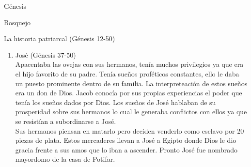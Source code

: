 \begin{section}{Génesis}
\begin{subsection}{Bosquejo}
\begin{subsubsection}{La historia patriarcal (Génesis 12-50)}
\begin{enumerate}
El regreso de Jacob a Canaán se narra que no fue sencillo, la riña entre Esaú y Jacob ponía en peligro la supervivencia de su propia familia. De manera inesperada se narra que Jacob lucha con Dios quien al final de la lucha le cambia el nombre de ``Jacob'' por el de ``Israel'', mostrando que aunque Jacob siempre había sido un engañador finalmente lo reconoce como Israle que significa ``el que lucha'', ese sería el nombre del resto de su descendencia.\\
En el antiguo Testamento cuando se habla del Ángel de Jehova se refiera a Dios Hijo. El propósito de este evento fue el de animar a Jacob por la preocupación que tenía del póximo encuentro con su hermano.\\
Jacob se encuentra finalmente con Esaú en el capítulo 33, el reencuentro de parte de Jacob es muy cauteloso y respetuoso pero Esaú al ver a Jacob va y lo besa en muestra de afecto y ambos lloran después de 20 años de separación. Jacob muestra el cambio de su ser, Esaú al igual no era el mismo, había cambiado su odio en afecto.\\
Jacob reinicia su viaje rumbo a Siquem y se pregunta sobre cómo habría de defenderse ante el peligro que se le presentaba con su familia. Dios le dice a Jacob que vaya a Betel y se le  volvió a aparecer, lo bendijo y le dio el mandamiento de que creciera y se multiplicara al igual que le promete la tierra que le había prometido a Abraham.\\
José desde muy joven criaba ovejas y le daba información a su padre acerca de lo que hacían sus hermanos. Jacob mostraba visible y notablemente su amor por José por su conducta fiel y correcta. Tanto José como Benjamín ya eran huérfanos pues Raquel ya había muerto.\newpage
\item José (Génesis 37-50)\\
	Apacentaba las ovejas con sus hermanos, tenía muchos privilegios ya que era el hijo favorito de su padre. Tenía sueños proféticos constantes, ello le daba un puesto prominente dentro de su familia. La interpreteación de estos sueños era un don de Dios. Jacob conocía por sus propias experiencias el poder que tenía los sueños dados por Dios. Los sueños de José hablaban de su prosperidad sobre sus hermanos lo cual le generaba conflictos con ellos ya que se resistían a subordinarse a José.\\
Sus hermanos piensan en matarlo pero deciden venderlo como esclavo por 20 piezas de plata. Estos mercaderes llevan a José a Egipto donde Dios le dio gracia frente a sus amos que lo iban a ascender. Pronto José fue nombrado mayordomo de la casa de Potifar.\\

\end{enumerate}
\end{subsubsection}
\end{subsection}
\end{section}
